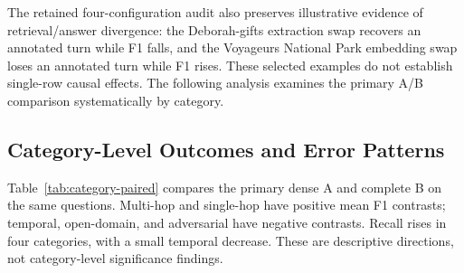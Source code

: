 \documentclass[a4paper,twoside]{article}
\begin{document}
The retained four-configuration audit also preserves illustrative evidence
of retrieval/answer divergence: the Deborah-gifts extraction swap recovers
an annotated turn while F1 falls, and the Voyageurs National Park embedding
swap loses an annotated turn while F1 rises. These selected examples do not
establish single-row causal effects. The following analysis examines the
primary A/B comparison systematically by category.

\subsection{Category-Level Outcomes and Error Patterns}
\label{sec:category-analysis}

Table~\ref{tab:category-paired} compares the primary dense A and complete B
on the same questions. Multi-hop and single-hop have positive mean F1
contrasts; temporal, open-domain, and adversarial have negative contrasts.
Recall rises in four categories, with a small temporal decrease. These are
descriptive directions, not category-level significance findings.
\end{document}
